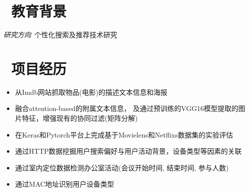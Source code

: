 \documentclass{resume}
\begin{document}


 
\section{\faGraduationCap\  教育背景}
\textit{研究方向}\ 个性化搜索及推荐技术研究

\section{\faUsers\ 项目经历}
\begin{onehalfspacing}
\begin{itemize}
	\item 从Imdb网站抓取物品(电影)的描述文本信息和海报
	\item 融合attention-based的附属文本信息， 及通过预训练的VGG16模型提取的图片特征，增强现有的协同过滤(矩阵分解)
	\item 在Keras和Pytorch平台上完成基于Movielens和Netflixs数据集的实验评估
\end{itemize}
\end{onehalfspacing}
\begin{onehalfspacing}
\begin{itemize}
  \item 通过HTTP数据挖掘用户搜索偏好与用户活动背景，设备类型等因素的关联
  \item 通过室内定位数据检测办公室活动(会议开始时间, 结束时间, 参与人数)
  \item 通过MAC地址识别用户设备类型
\end{itemize}
\end{onehalfspacing}
\end{document}
